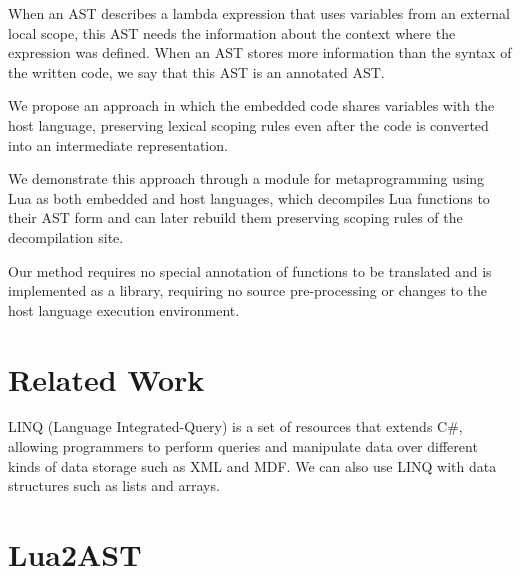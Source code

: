 \documentclass[english]{llncs}
\begin{document}
When an AST describes a lambda expression that uses variables from an
external local scope, this AST needs the information about the context
where the expression was defined.
When an AST stores more information than the syntax of the written code,
we say that this AST is an annotated AST.

We propose an approach in which the embedded code shares variables with the
host language, preserving lexical scoping rules even after the code is
converted into an intermediate representation.

We demonstrate this approach
through a module for metaprogramming using Lua as both embedded and host
languages, which decompiles Lua functions to their AST form and can later
rebuild them preserving scoping rules of the decompilation site.

Our method
requires no special annotation of functions to be translated and is
implemented as a library, requiring no source pre-processing or changes to
the host language execution environment.

\section{Related Work}

LINQ (Language Integrated-Query) \cite{linq} is a set of resources that
extends C\#, allowing programmers to perform queries and manipulate data over
different kinds of data storage such as XML and MDF.
We can also use LINQ with data structures such as lists and arrays.

\cite{Calcagno2003implementing}

\cite{Taha2004gentle,Taha2008gentle}

\cite{Taha2000MetaML}

\cite{Taha1999MSP}

\cite{Westbrook2010Mint}

\section{Lua2AST}
\end{document}
